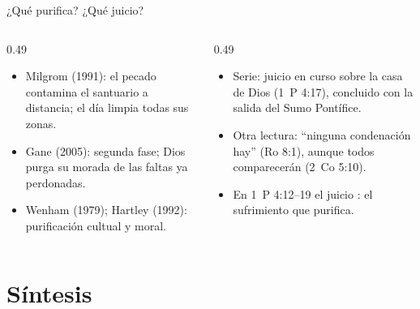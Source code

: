 \begin{frame}{¿Qué purifica? ¿Qué juicio?}
\begin{columns}[t,onlytextwidth]
\begin{column}{0.49\textwidth}\scriptsize
{}
\begin{itemize}
\item Milgrom (1991): el pecado contamina el santuario a distancia; el día limpia todas sus zonas.
\item Gane (2005): segunda fase; Dios purga su morada de las faltas ya perdonadas.
\item Wenham (1979); Hartley (1992): purificación cultual y moral.
\end{itemize}
\end{column}
\begin{column}{0.49\textwidth}\scriptsize
{}
\begin{itemize}
\item Serie: juicio en curso sobre la casa de Dios (1~P 4:17), concluido con la salida del Sumo Pontífice.
\item Otra lectura: ``ninguna condenación hay'' (Ro 8:1), aunque todos comparecerán (2~Co 5:10).
\item En 1~P 4:12--19 el juicio : el sufrimiento que purifica.
\end{itemize}
\end{column}
\end{columns}
\end{frame}

\section{Síntesis}

